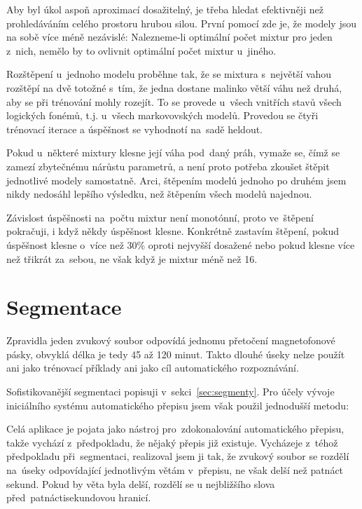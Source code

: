 \begin{enumerate}
Aby byl úkol aspoň aproximací dosažitelný, je třeba hledat efektivněji než
prohledáváním celého prostoru hrubou silou. První pomocí zde je, že modely jsou
na sobě více méně nezávislé: Nalezneme-li optimální počet mixtur pro jeden
z~nich, nemělo by to ovlivnit optimální počet mixtur u~jiného.

Rozštěpení u~jednoho modelu proběhne tak, že se mixtura s~největší vahou
rozštěpí na dvě totožné s~tím, že jedna dostane malinko větší váhu než druhá, aby se
při trénování mohly rozejít. To se provede u~všech vnitřích stavů všech
logických fonémů, t.j. u~všech markovovských modelů. Provedou se čtyři trénovací
iterace a úspěšnost se vyhodnotí na~sadě heldout.

Pokud u~některé mixtury klesne její váha pod~daný práh, vymaže se, čímž se
zamezí zbytečnému nárůstu parametrů, a není proto potřeba zkoušet štěpit
jednotlivé modely samostatně. Arci, štěpením modelů jednoho po druhém jsem nikdy nedosáhl lepšího
výsledku, než štěpením všech modelů najednou.

Závislost úspěšnosti na~počtu mixtur není monotónní, proto ve~štěpení pokračuji,
i když někdy úspěšnost klesne. Konkrétně zastavím štěpení, pokud úspěšnost
klesne o~více než 30\% oproti nejvyšší dosažené nebo pokud klesne více než
třikrát za~sebou, ne však když je mixtur méně než 16.


\end{enumerate}

\section{Segmentace}

Zpravidla jeden zvukový soubor odpovídá jednomu přetočení magnetofonové pásky,
obvyklá délka je tedy 45 až 120 minut. Takto dlouhé úseky nelze použít ani jako
trénovací příklady ani jako cíl automatického rozpoznávání.

Sofistikovanější segmentaci popisuji v~sekci~\ref{sec:segmenty}. Pro účely
vývoje iniciálního systému automatického přepisu jsem však použil jednodušší
metodu:

Celá aplikace je pojata jako nástroj pro~zdokonalování automatického přepisu,
takže vychází z~předpokladu, že nějaký přepis již existuje. Vycházeje z~téhož
předpokladu při~segmentaci, realizoval jsem ji tak, že zvukový soubor se rozdělí
na~úseky odpovídající jednotlivým větám v~přepisu, ne však delší než patnáct
sekund. Pokud by věta byla delší, rozdělí se u nejbližšího slova
před~patnáctisekundovou hranicí.

